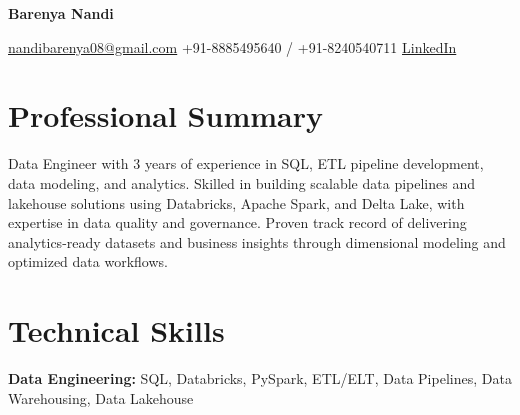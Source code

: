 \documentclass[10pt,a4paper]{article}
\begin{document}

\begin{center}

{\Huge \textbf{Barenya Nandi}}

\vspace{5pt}

\small
\faEnvelope \hspace{2pt}
\href{mailto:nandibarenya08@gmail.com}{nandibarenya08@gmail.com}
\hspace{12pt}
\faPhone \hspace{2pt}
+91-8885495640 / +91-8240540711
\hspace{12pt}
\faLinkedin \hspace{2pt}
\href{https://www.linkedin.com/in/barenya-nandi-243a2a278/}
{LinkedIn}

\end{center}

\vspace{-4pt}



\section{Professional Summary}

\small
Data Engineer with 3 years of experience in SQL, ETL pipeline development, data modeling, and analytics. Skilled in building scalable data pipelines and lakehouse solutions using Databricks, Apache Spark, and Delta Lake, with expertise in data quality and governance. Proven track record of delivering analytics-ready datasets and business insights through dimensional modeling and optimized data workflows.


\section{Technical Skills}

\textbf{Data Engineering:}
SQL, Databricks, PySpark, ETL/ELT, Data Pipelines, Data Warehousing, Data Lakehouse

\vspace{2pt}
\end{document}
